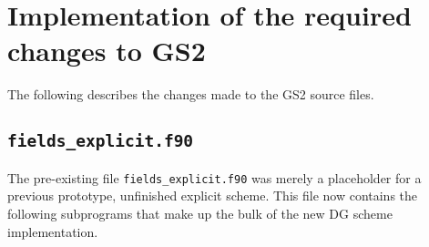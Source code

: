 \documentclass[10pt,a4paper]{article}
\begin{document}
\newpage
\section{Implementation of the required changes to GS2}
\label{sec:gs2_changes}

The following describes the changes made to the GS2 source files.

\subsection{\texttt{fields\_explicit.f90}}
\label{sec:fields_explicit.f90}

The pre-existing file \texttt{fields\_explicit.f90} was merely a placeholder for a
previous prototype, unfinished explicit scheme. This file now contains the
following subprograms that make up the bulk of the new DG scheme implementation.
\end{document}
